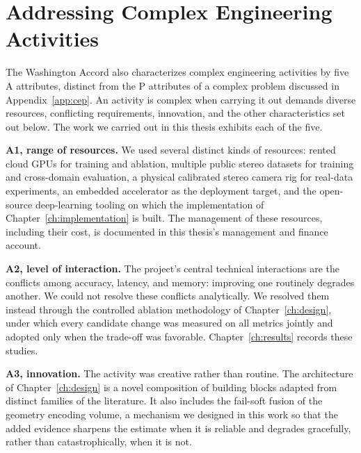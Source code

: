 \chapter{Addressing Complex Engineering Activities}
\label{app:cea}

The Washington Accord also characterizes complex engineering
activities by five A attributes, distinct from the P attributes of a
complex problem discussed in Appendix~\ref{app:cep}. An activity is
complex when carrying it out demands diverse resources, conflicting
requirements, innovation, and the other characteristics set out below.
The work we carried out in this thesis exhibits each of the five.

\textbf{A1, range of resources.} We used several distinct kinds of
resources: rented cloud GPUs for training and ablation, multiple
public stereo datasets for training and cross-domain evaluation, a
physical calibrated stereo camera rig for real-data experiments, an
embedded accelerator as the deployment target, and the open-source
deep-learning tooling on which the implementation of
Chapter~\ref{ch:implementation} is built. The management of these
resources, including their cost, is documented in this thesis's
management and finance account.

\textbf{A2, level of interaction.} The project's central technical
interactions are the conflicts among accuracy, latency, and memory:
improving one routinely degrades another. We could not resolve these
conflicts analytically. We resolved them instead through the
controlled ablation methodology of Chapter~\ref{ch:design}, under
which every candidate change was measured on all metrics jointly and
adopted only when the trade-off was favorable. Chapter~\ref{ch:results}
records these studies.

\textbf{A3, innovation.} The activity was creative rather than
routine. The architecture of Chapter~\ref{ch:design} is a novel
composition of building blocks adapted from distinct families of the
literature. It also includes the fail-soft fusion of the geometry
encoding volume, a mechanism we designed in this work so that the
added evidence sharpens the estimate when it is reliable and degrades
gracefully, rather than catastrophically, when it is not.

